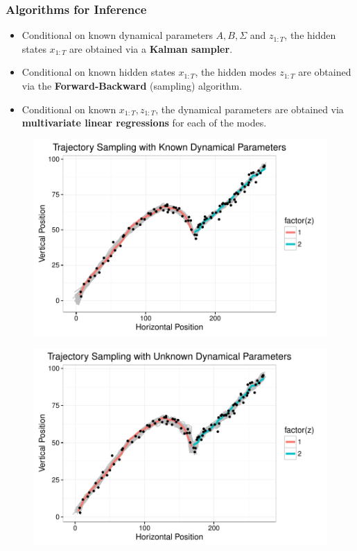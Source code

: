 \documentclass{beamer}
\begin{document}
\begin{frame}
\frametitle{Algorithms for Inference}
\begin{itemize}
\item Conditional on known dynamical parameters $A,B,\Sigma$ and $z_{1:T}$, the hidden states $x_{1:T}$ are obtained via a \textbf{Kalman sampler}.
\item Conditional on known hidden states $x_{1:T}$, the hidden modes $z_{1:T}$ are obtained via the \textbf{Forward-Backward} (sampling) algorithm.
\item Conditional on known $x_{1:T},z_{1:T}$, the dynamical parameters are obtained via \textbf{multivariate linear regressions} for each of the modes.
\end{itemize}
\end{frame}

\begin{frame}
\begin{figure}
  \centering
  \includegraphics[width = 1\linewidth]{"./plot/lds/01_projectile_known"}
\end{figure}
\end{frame}

\begin{frame}
\begin{figure}
  \centering
  \includegraphics[width = 1\linewidth]{"./plot/lds/02_projectile_unknown"}
\end{figure}
\end{frame}
\end{document}
